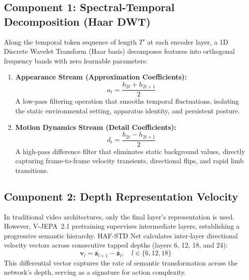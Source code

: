 \documentclass[a4paper, 11pt]{article}
\begin{document}
\subsection{Component 1: Spectral-Temporal Decomposition (Haar DWT)}
Along the temporal token sequence of length $T'$ at each encoder layer, a 1D Discrete Wavelet Transform (Haar basis) decomposes features into orthogonal frequency bands with zero learnable parameters:
\begin{enumerate}
    \item \textbf{Appearance Stream (Approximation Coefficients):}
    \begin{equation}
        a_t = \frac{h_{2t} + h_{2t+1}}{2}
    \end{equation}
    A low-pass filtering operation that smooths temporal fluctuations, isolating the static environmental setting, apparatus identity, and persistent posture.
    \item \textbf{Motion Dynamics Stream (Detail Coefficients):}
    \begin{equation}
        d_t = \frac{h_{2t} - h_{2t+1}}{2}
    \end{equation}
    A high-pass difference filter that eliminates static background values, directly capturing frame-to-frame velocity transients, directional flips, and rapid limb transitions.
\end{enumerate}

\subsection{Component 2: Depth Representation Velocity}
In traditional video architectures, only the final layer's representation is used. However, V-JEPA~2.1 pretraining supervises intermediate layers, establishing a progressive semantic hierarchy. HAF-STD Net calculates inter-layer directional velocity vectors across consecutive tapped depths (layers 6, 12, 18, and 24):
\begin{equation}
    \mathbf{v}_l = \bar{\mathbf{z}}_{l+1} - \bar{\mathbf{z}}_l, \quad l \in \{6, 12, 18\}
\end{equation}
This differential vector captures the rate of semantic transformation across the network's depth, serving as a signature for action complexity.
\end{document}
